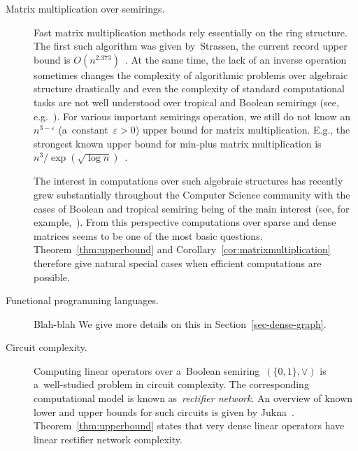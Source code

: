 \documentclass[11pt,letterpaper]{article}
\begin{document}
\begin{description}
\item[Matrix multiplication over semirings.] Fast matrix
multiplication methods rely essentially on the ring structure.
The first such algorithm was given by~Strassen, 
the current record upper bound is $O(n^{2.373})$~\cite{DBLP:conf/stoc/Williams12, DBLP:conf/issac/Gall14a}.
At the same time, the lack of an inverse operation sometimes
changes the complexity of algorithmic problems over algebraic 
structure drastically and even the complexity of standard 
computational tasks are not well understood over tropical and 
Boolean semirings (see, e.g.~\cite{Williams14,GrigorievP15}).
For various important semirings operation, 
we still do not know an $n^{3-\varepsilon}$ (a~constant~$\varepsilon>0$) upper bound for matrix multiplication.
E.g., the strongest known upper bound for min-plus matrix
multiplication is $n^3/\exp(\sqrt{\log n})$~\cite{Williams14}. 

The interest in computations over such algebraic structures has 
recently grew substantially throughout the
Computer Science community with the cases of Boolean and 
tropical semiring being of the main interest (see, for
example,~\cite{Jukna16,Williams14,butkovic10systems}).
From this perspective computations over sparse and dense 
matrices seems to be one of the most basic questions.
Theorem~\ref{thm:upperbound} and Corollary~\ref{cor:matrixmultiplication} therefore give natural special
cases when efficient computations are possible.

\item[Functional programming languages.]
Blah-blah
We give more details on this in Section~\ref{sec-dense-graph}.

\item[Circuit complexity.] Computing linear operators over
a~Boolean semiring~$(\{0,1\}, \lor)$ is a~well-studied problem 
in circuit complexity. The corresponding computational model is known as~\emph{rectifier network}. An overview of
known lower and upper bounds for such circuits is given by Jukna~\cite[Section~13.6]{DBLP:books/daglib/0028687}. Theorem~\ref{thm:upperbound} states that very dense linear operators have
linear rectifier network complexity.
\end{description}
\end{document}
